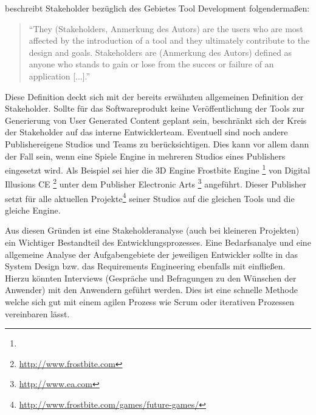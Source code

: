\documentclass[pagesize, paper=a4, fontsize=12pt, titlepage=true, headings=small, headnosepline, abstractoff, liststotoc, nochapterprefix, plainheadsepline, twoside]{scrreprt}
\begin{document}
\autocite{Wihlidal2006} beschreibt Stakeholder bezüglich des Gebietes Tool Development folgendermaßen:
\begin{quote}
“They (Stakeholders, Anmerkung des Autors) are the users who are most affected by the introduction of a tool and they ultimately contribute to the design and goals. Stakeholders are (Anmerkung des Autors) defined as anyone who stands to gain or lose from the succes or failure of an application [...].” \autocite[S. 4-5]{Wihlidal2006}
\end{quote}
Diese Definition deckt sich mit der bereits erwähnten allgemeinen Definition der Stakeholder. Sollte für das Softwareprodukt keine Veröffentlichung der Tools zur Generierung von User Generated Content geplant sein, beschränkt sich der Kreis der Stakeholder auf das interne Entwicklerteam. Eventuell sind noch andere Publishereigene Studios und Teams zu berücksichtigen. Dies kann vor allem dann der Fall sein, wenn eine Spiele Engine in mehreren Studios eines Publishers eingesetzt wird. Als Beispiel sei hier die 3D Engine Frostbite Engine \footnote{} von Digital Illusions CE \footnote{\url{http://www.frostbite.com}} unter dem Publisher Electronic Arts \footnote{\url{http://www.ea.com}} angeführt. Dieser Publisher setzt für alle aktuellen Projekte\footnote{\url{http://www.frostbite.com/games/future-games/}} seiner Studios auf die gleichen Tools und die gleiche Engine.

Aus diesen Gründen ist eine Stakeholderanalyse (auch bei kleineren Projekten) ein Wichtiger Bestandteil des Entwicklungsprozesses. Eine Bedarfsanalye und eine allgemeine Analyse der Aufgabengebiete der jeweiligen Entwickler sollte in das System Design bzw. das Requirements Engineering ebenfalls mit einfließen. Hierzu könnten Interviews (Gespräche und Befragungen zu den Wünschen der Anwender) mit den Anwendern geführt werden. Dies ist eine schnelle Methode welche sich gut mit einem agilen Prozess wie Scrum oder iterativen Prozessen vereinbaren lässt.
\end{document}
